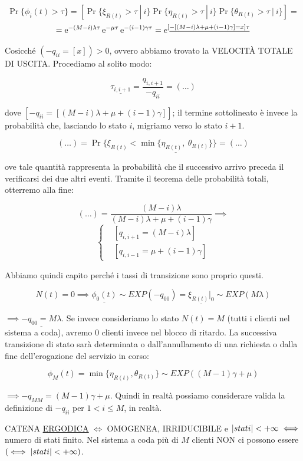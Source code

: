 \[
	\Pr\{\phi_i(t)>\tau\} = [\Pr\{\xi_{R(t)} > \tau\ |\ i\}\Pr\{\eta_{R(t)} > \tau\ |\ i\}\Pr\{\theta_{R(t)} > \tau\ |\ i\}] =
\]
\[	
	= \mathop{}\!\mathrm{e}^{-(M-i)\lambda\tau}\mathop{}\!\mathrm{e}^{-\mu\tau}\mathop{}\!\mathrm{e}^{-(i-1)\gamma\tau} = e^{[\underline{-[(M-i)\lambda+\mu+(i-1)\gamma] = x]\tau}}
\]

Cosicché $(-q_{ii}=[x]) > 0$, ovvero abbiamo trovato la VELOCIT\`A TOTALE DI USCITA. Procediamo al solito modo:

\[
	\underline{\tau_{i,i+1}} = \frac{q_{i,i+1}}{-q_{ii}} = (\dots)
\]

dove $[-q_{ii}=[(M-i)\lambda+\mu+(i-1)\gamma]]$; il termine sottolineato è invece la probabilità che, lasciando lo stato $i$, migriamo verso lo stato $i+1$.

\[
	(\dots) = \Pr\{\xi_{R(t)} < \underline{\min\{\eta_{R(t)},\ \theta_{R(t)}\}}\} = (\dots)
\]

ove tale quantità rappresenta la probabilità che il successivo arrivo preceda il verificarsi dei due altri eventi. Tramite il teorema delle probabilità totali, otterremo alla fine:

\[
	(\dots) = \frac{(M-i)\lambda}{(M-i)\lambda+\mu+(i-1)\gamma} \implies
\]
\[
	\left\{
	\begin{aligned}
	&[q_{i,i+1} = (M-i)\lambda]\\
	&[q_{i,i-1} = \mu+(i-1)\gamma]
	\end{aligned}
	\right.
\]

Abbiamo quindi capito perché i tassi di transizione sono proprio questi. 

\[
	N(t)=0 \implies \underline{\phi_0(t)}\sim EXP(-q_{00}) =\underline{\xi_{R(t)}|_0} \sim EXP(M\lambda)
\]

$\implies \underline{-q_{00} = M\lambda}$. Se invece consideriamo lo stato $N(t)=M$ (tutti i clienti nel sistema a coda), avremo 0 clienti invece nel blocco di ritardo. La successiva transizione di stato sarà determinata o dall'annullamento di una richiesta o dalla fine dell'erogazione del servizio in corso:

\[
	\phi_M(t) = \min\{\eta_{R(t)}, \theta_{R(t)}\} \sim EXP((M-1)\gamma+\mu)
\]

$\implies -q_{MM} = (M-1)\gamma+\mu$. Quindi in realtà possiamo considerare valida la definizione di $-q_{ii}$ per $1<i\leq M$, in realtà.

CATENA \underline{\underline{ERGODICA}} $\iff$ OMOGENEA, IRRIDUCIBILE e $\left\vert{stati}\right\vert<+\infty\iff$ numero di stati finito. Nel sistema a coda più di $M$ clienti NON ci possono essere $(\iff \left\vert{stati}\right\vert<+\infty)$. 


